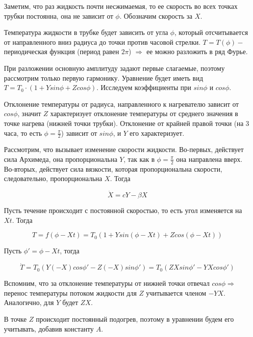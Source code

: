 \documentclass[12pt]{article}
\begin{document}
Заметим, что раз жидкость почти несжимаемая, то ее скорость во всех точках трубки постоянна, она не зависит от $\phi$. Обозначим скорость за $X$.

Температура жидкости в трубке будет зависить от угла $\phi$, который отсчитывается от направленного вниз радиуса до точки против часовой стрелки. $T = T(\phi) -$ периодическая функция (период равен $2\pi$) $\Rightarrow$ ее можно разложить в ряд Фурье.

При разложении основную амплитуду задают первые слагаемые, поэтому рассмотрим только первую гармонику. Уравнение будет иметь вид $T = T_0 \cdot (1+Ysin\phi + Zcos\phi)$. Исследуем коэффициенты при $sin\phi$ и $cos\phi$.

Отклонение температуры от радиуса, направленного к нагревателю зависит от $cos \phi$, значит $Z$ характеризует отклонение температуры от среднего значения в точке нагрева (нижней точки трубки). Отклонение от крайней правой точки (на 3 часа, то есть $\phi = \frac{\pi}{2}$) зависит от $sin\phi$, и $Y$ его характеризует.

Рассмотрим, что вызывает изменение скорости жидкости. Во-первых, действует сила Архимеда, она пропорциональна $Y$, так как в $\phi=\frac{\pi}{2}$ она направлена вверх. Во-вторых, действует сила вязкости, которая пропорциональна скорости, следовательно, пропорциональна $X$. Тогда

\begin{equation}
	\dot{X} = cY-\beta X
\end{equation}

Пусть течение происходит с постоянной скоростью, то есть угол изменяется на $Xt$. Тогда

\begin{equation}
	T=f(\phi-Xt)=T_0(1+Ysin(\phi-Xt)+Zcos(\phi-Xt))
\end{equation}

Пусть $\phi'=\phi-Xt$, тогда

\begin{equation}
	\dot{T}=T_0(Y(-X)cos\phi'-Z(-X)sin\phi')=T_0(ZXsin\phi'-YXcos\phi')
\end{equation}

Вспомним, что за отклонение температуры от нижней точки отвечал $cos\phi \Longrightarrow$ перенос температуры потоком жидкости для $Z$ учитывается членом $-YX$. Аналогично, для $Y$ будет $ZX$.

В точке $Z$ происходит постоянный подогрев, поэтому в уравнении будем его учитывать, добавив константу $A$. 
\end{document}
